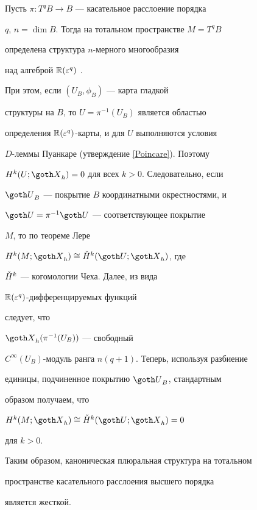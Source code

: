 \begin{exam} Пусть $\pi: T^qB \to B$ --- касательное расслоение порядка


$q$, $n = \dim B$. Тогда на тотальном пространстве $M = T^qB$


определена структура $n$-мерного многообразия


над алгеброй $\Bbb R(\varepsilon^q)$ \cite{Vish}.


При этом, если $(U_B,\phi_B)$ --- карта гладкой


структуры на $B$, то $U=\pi^{-1}(U_B)$ является областью


определения $\Bbb R(\varepsilon^q)$-карты, и для $U$ выполняются условия


$D$-леммы Пуанкаре (утверждение \ref{Poincare}). Поэтому


$H^k(U;{\goth X}_h) = 0$ для всех $k>0$. Следовательно, если


${\goth U}_B$ --- покрытие $B$ координатными окрестностями, и


${\goth U} = \pi^{-1}{\goth U}$ --- соответствующее покрытие


$M$, то по теореме Лере


$H^k(M;{\goth X}_h) \cong \Check H^k({\goth U}; {\goth X}_h)$, где


$\Check H^k$ --- когомологии Чеха. Далее, из вида


$\Bbb R(\varepsilon^q)$-дифференцируемых функций \cite{Vish}


следует, что


${\goth X}_h(\pi^{-1}(U_B))$ --- свободный


$C^\infty(U_B)$-модуль ранга $n(q+1)$. Теперь, используя разбиение


единицы, подчиненное покрытию ${\goth U}_B$, стандартным


образом получаем, что


$H^k(M;{\goth X}_h) \cong \Check H^k({\goth U}; {\goth X}_h) = 0$


для $k > 0$.





Таким образом, каноническая плюральная структура на тотальном


пространстве касательного расслоения высшего порядка


является жесткой.


\end{exam}






